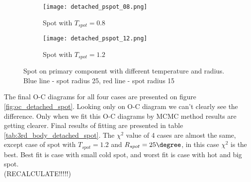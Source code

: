 \begin{figure}[!h]
    \centering
    \begin{subfigure}[t]{0.5\textwidth}
        \centering
        \texttt{[image: detached\_pspot\_08.png]}
        \caption{Spot with $T_{spot}=0.8$}
    \end{subfigure}%
    \begin{subfigure}[t]{0.5\textwidth}
        \centering
        \texttt{[image: detached\_pspot\_12.png]}
        \caption{Spot with $T_{spot}=1.2$}
    \end{subfigure}
    \caption{Spot on primary component with different temperature and radius. 
    Blue line - spot radius 25\degree, red line - spot radius 15\degree}
\label{fig:detached_spots}
\end{figure}

The final O-C diagrams for all four cases are presented on figure \ref{fig:oc_detached_spot}. Looking only on O-C diagram we can't clearly see the difference. Only when we fit this O-C diagrams by MCMC method results are getting clearer. 
Final results of fitting are presented in table \ref{tab:3rd_body_detached_spot}. The $\chi^2$ value of 4 cases are almost the same, except case of spot with $T_{spot}=1.2$ and $R_{spot}=25\degree$, in this case $\chi^2$ is the best. 
Best fit is case with small cold spot, and worst fit is case with hot and big spot.\\
(RECALCULATE!!!!!) 

